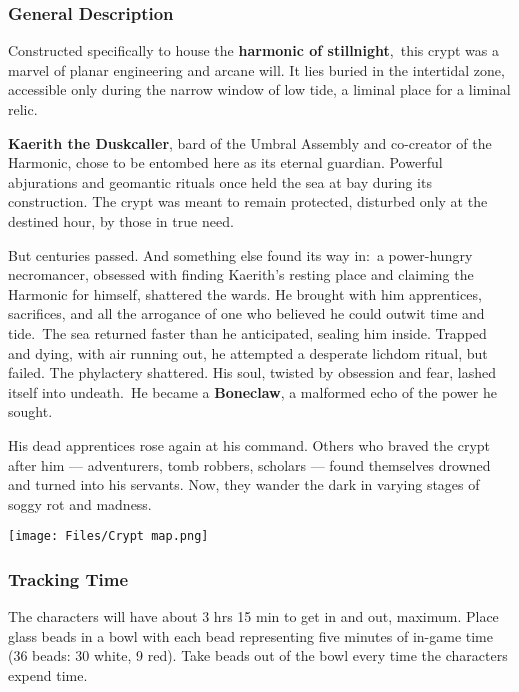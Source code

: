 \documentclass[10pt,twocolumn]{article}
\renewcommand{\textsc}[1]{\XCharterSC#1}
\let\oldtextbf\textbf
\renewcommand{\textbf}[1]{\oldtextbf{{#1}}}
\providecommand{\pandocbounded}[1]{#1}
\begin{document}
\subsubsection{General Description}\label{general-description}

Constructed specifically to house the
\textcolor{keywordcolor}{\textbf{\textsc{harmonic of stillnight}}},~this
crypt was a marvel of planar engineering and arcane will. It lies buried
in the intertidal zone, accessible only during the narrow window of low
tide, a liminal place for a liminal relic.

\textbf{Kaerith the Duskcaller}, bard of the Umbral Assembly and
co-creator of the Harmonic, chose to be entombed here as its eternal
guardian. Powerful abjurations and geomantic rituals once held the sea
at bay during its construction. The crypt was meant to remain protected,
disturbed only at the destined hour, by those in true need.

But centuries passed. And something else found its way in:~a
power-hungry necromancer, obsessed with finding Kaerith's resting place
and claiming the Harmonic for himself, shattered the wards. He brought
with him apprentices, sacrifices, and all the arrogance of one who
believed he could outwit time and tide.~The sea returned faster than he
anticipated, sealing him inside. Trapped and dying, with air running
out, he attempted a desperate lichdom ritual, but failed. The phylactery
shattered. His soul, twisted by obsession and fear, lashed itself into
undeath.~He became a \textbf{Boneclaw}, a malformed echo of the power he
sought.

His dead apprentices rose again at his command. Others who braved the
crypt after him --- adventurers, tomb robbers, scholars --- found
themselves drowned and turned into his servants. Now, they wander the
dark in varying stages of soggy rot and madness.

\pandocbounded{\texttt{[image: Files/Crypt map.png]}}

\subsubsection{Tracking Time}\label{tracking-time}

The characters will have about 3 hrs 15 min to get in and out, maximum.
Place glass beads in a bowl with each bead representing five minutes of
in-game time (36 beads: 30 white, 9 red). Take beads out of the bowl
every time the characters expend time.
\end{document}
